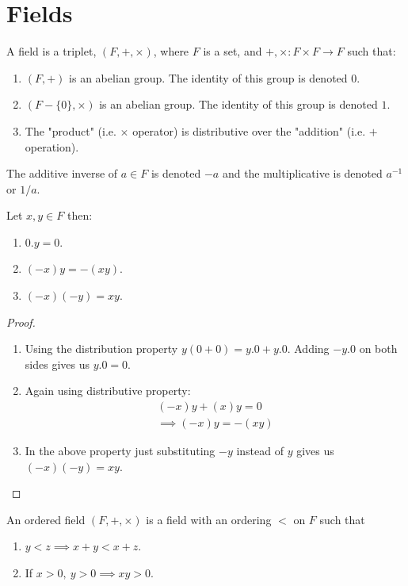 \section{Fields}
\begin{definition}[Fields]
  A field is a triplet, $(F, +, \times)$, where $F$ is a set, and $+,\times:F\times F\to F$ such that:
  \begin{enumerate}
    \item $(F, +)$ is an abelian group. The identity of this group is denoted $0$.
    \item $(F-\{0\}, \times)$ is an abelian group. The identity of this group is denoted $1$.
    \item The "product" (i.e. $\times$ operator) is distributive over the "addition" (i.e. $+$ operation). 
  \end{enumerate}
\end{definition}
The additive inverse of $a\in F$ is denoted $-a$ and the multiplicative is denoted $a^{-1}$ or $1/a$.
\begin{proposition}
  Let $x,y\in F$ then:
  \begin{enumerate}
    \item $0.y = 0$.
    \item $(-x)y = -(xy)$.
    \item $(-x)(-y) = xy$.
  \end{enumerate}
\end{proposition}
\begin{proof}
  \begin{enumerate}
    \item Using the distribution property $y(0+0) = y.0 + y.0$. Adding $-y.0$ on both sides gives us $y.0 = 0$.
    \item Again using distributive property:
      \begin{align*}
        (-x)y + (x)y = 0\\
        \implies (-x)y = -(xy)
      \end{align*}
    \item In the above property just substituting $-y$ instead of $y$ gives us $(-x)(-y) = xy$.
  \end{enumerate}
\end{proof}
\begin{definition}
  An ordered field $(F, +, \times )$ is a field with an ordering $<$ on $F$ such that
  \begin{enumerate}
    \item $y<z \implies x+y < x+z$.
    \item If $x>0,\ y>0 \implies xy>0 $.
  \end{enumerate}
\end{definition}

